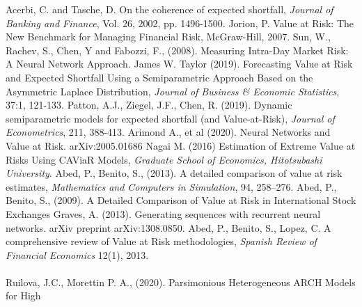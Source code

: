 \documentclass[a4paper,11pt,oneside]{book}
\begin{document}



Acerbi, C. and Tasche, D. On the coherence of expected shortfall, \textit{Journal of Banking and Finance}, Vol. 26, 2002,
pp. 1496-1500.\newline\newline
Jorion, P. Value at Risk: The New Benchmark for Managing Financial Risk, McGraw-Hill, 2007.\newline\newline
Sun, W., Rachev, S., Chen, Y and Fabozzi, F., (2008). Measuring Intra-Day Market
Risk: A Neural Network Approach.\newline\newline
James W. Taylor (2019). Forecasting Value at Risk and Expected Shortfall
Using a Semiparametric Approach Based on the Asymmetric Laplace Distribution, \textit{Journal of
Business \& Economic Statistics}, 37:1, 121-133.\newline\newline
Patton, A.J., Ziegel, J.F., Chen, R. (2019). Dynamic semiparametric models for expected shortfall
(and Value-at-Risk), \textit{Journal of Econometrics}, 211, 388-413.\newline\newline
Arimond A., et al (2020). Neural Networks and Value at Risk. 	arXiv:2005.01686\newline\newline
Nagai M. (2016) Estimation of Extreme Value at Risks Using CAViaR Models, \textit{Graduate School of Economics, Hitotsubashi University}.\newline\newline
Abed, P., Benito, S., (2013). A detailed comparison of value at risk estimates, \textit{Mathematics and Computers in Simulation}, 94, 258–276.\newline\newline
Abed, P., Benito, S., (2009). A Detailed Comparison of Value at Risk in International Stock Exchanges\newline\newline
Graves, A. (2013). Generating sequences with recurrent neural networks. arXiv preprint arXiv:1308.0850.\newline\newline
Abed, P., Benito, S., Lopez, C. A comprehensive review of Value at Risk methodologies, \textit{Spanish Review of Financial Economics} 12(1), 2013. \\\\
Ruilova, J.C., Morettin P. A., (2020). Parsimonious Heterogeneous ARCH Models for High
\end{document}
